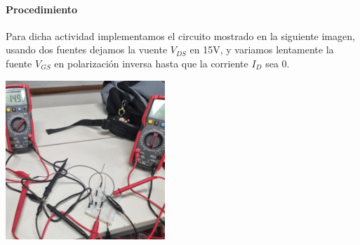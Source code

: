 \paragraph{Procedimiento}

Para dicha actividad implementamos el circuito mostrado en la siguiente imagen, usando dos fuentes dejamos la vuente $V_{DS}$ en 15V, y variamos lentamente la fuente $V_{GS}$ en polarización inversa hasta que la corriente $I_D$ sea 0.

\includegraphics[width=6cm]{./imagenes/Lab2.jpg}

\begin{table}[ht]
\end{table}

\vspace{0.1cm}

